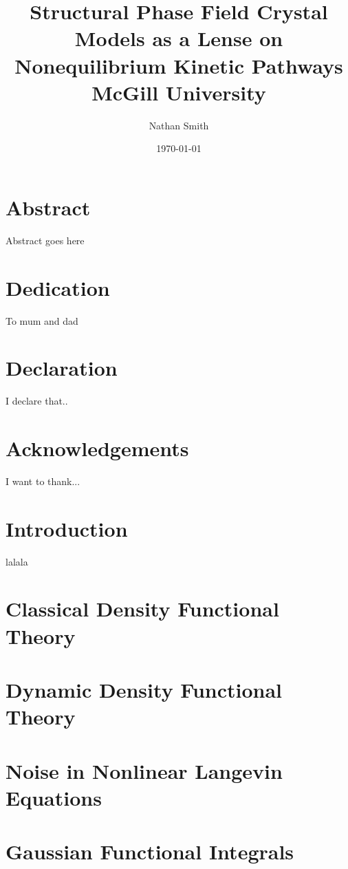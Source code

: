 \documentclass[11pt, letterpaper, twoside, openright]{book}
\title{
	{Structural Phase Field Crystal Models as a Lense on Nonequilibrium Kinetic Pathways}\\
	{\large McGill University}\\
}
\author{Nathan Smith}
\date{\today}
\begin{document}
\maketitle

\chapter*{Abstract}
Abstract goes here

\chapter*{Dedication}
To mum and dad

\chapter*{Declaration}
I declare that..

\chapter*{Acknowledgements}
I want to thank...

\tableofcontents

\chapter{Introduction}
lalala

\chapter{Classical Density Functional Theory}


\chapter{Dynamic Density Functional Theory}


\appendix

\chapter{Noise in Nonlinear Langevin Equations}
\begin{refsection}

\printbibliography
\end{refsection}

\chapter{Gaussian Functional Integrals}
\begin{refsection}

\printbibliography
\end{refsection}
\end{document}

